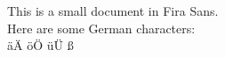 \documentclass{article}
\begin{document}
This is a small document in Fira Sans.
\\
Here are some German characters:
\\
äÄ öÖ üÜ ß
\end{document}
